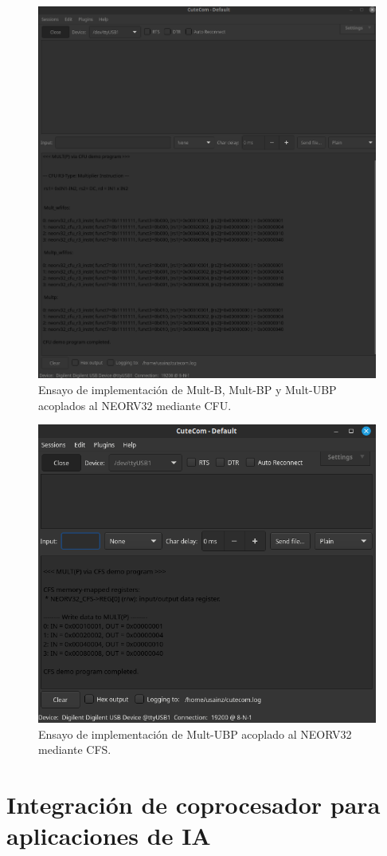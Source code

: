 \begin{figure}[H]
    \centering
    \includegraphics[width=14cm]{Figuras/impl3.png}
    \caption{Ensayo de implementación de Mult-B, Mult-BP y Mult-UBP acoplados al NEORV32 mediante CFU.}
    \label{fig:impl3}
\end{figure}

\begin{figure}[H]
    \centering
    \includegraphics[width=14cm]{Figuras/impl4.png}
    \caption{Ensayo de implementación de Mult-UBP acoplado al NEORV32 mediante CFS.}
    \label{fig:impl4}
\end{figure}

\section{Integración de coprocesador para aplicaciones de IA}

\label{Integ}


